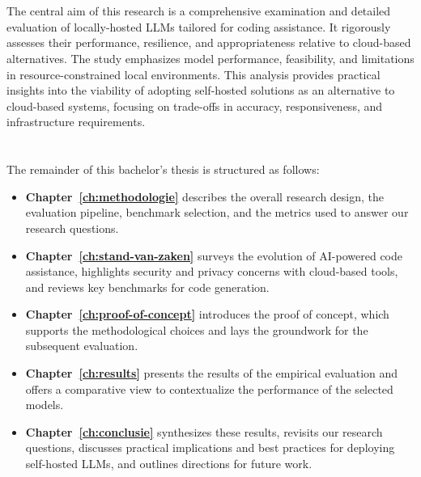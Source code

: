 \section{}%
\label{sec:onderzoeksdoelstelling}

The central aim of this research is a comprehensive examination and detailed evaluation of locally-hosted \glspl{LLM} tailored for coding assistance. It rigorously assesses their performance, resilience, and appropriateness relative to cloud-based alternatives. The study emphasizes model performance, feasibility, and limitations in resource-constrained local environments. This analysis provides practical insights into the viability of adopting self-hosted solutions as an alternative to cloud-based systems, focusing on trade-offs in accuracy, responsiveness, and infrastructure requirements.

\section{}%
\label{sec:opzet-bachelorproef}


The remainder of this bachelor's thesis is structured as follows:

\begin{itemize}
	\item \textbf{Chapter~\ref{ch:methodologie}} describes the overall research design, the evaluation pipeline, benchmark selection, and the metrics used to answer our research questions.
	\item \textbf{Chapter~\ref{ch:stand-van-zaken}} surveys the evolution of \gls{AI}-powered code assistance, highlights security and privacy concerns with cloud-based tools, and reviews key benchmarks for code generation.
	\item \textbf{Chapter~\ref{ch:proof-of-concept}} introduces the proof of concept, which supports the methodological choices and lays the groundwork for the subsequent evaluation.
	\item \textbf{Chapter~\ref{ch:results}} presents the results of the empirical evaluation and offers a comparative view to contextualize the performance of the selected models.
	\item \textbf{Chapter~\ref{ch:conclusie}} synthesizes these results, revisits our research questions, discusses practical implications and best practices for deploying self-hosted \glspl{LLM}, and outlines directions for future work.
\end{itemize}

